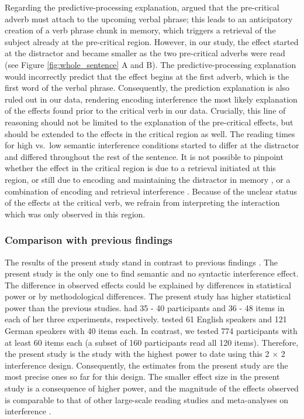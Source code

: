\documentclass[a4paper, man, floatsintext]{apa7}
\begin{document}
Regarding the predictive-processing explanation, \citet{mertzen} argued that the pre-critical adverb must attach to the upcoming verbal phrase; this leads to an anticipatory creation of a verb phrase chunk in memory, which triggers a retrieval of the subject already at the pre-critical region. However, in our study, the effect started at the distractor and became smaller as the two pre-critical adverbs were read (see Figure \ref{fig:whole_sentence} A and B). The predictive-processing explanation would incorrectly predict that the effect begins at the first adverb, which is the first word of the verbal phrase. Consequently, the prediction explanation is also ruled out in our data, rendering encoding interference the most likely explanation of the effects found prior to the critical verb in our data. Crucially, this line of reasoning should not be limited to the explanation of the pre-critical effects, but should be extended to the effects in the critical region as well. The reading times for high vs.\ low semantic interference conditions started to differ at the distractor and differed throughout the rest of the sentence. It is not possible to pinpoint whether the effect in the critical region is due to a retrieval initiated at this region, or still due to encoding and maintaining the distractor in memory \citep{ness2017}, or a combination of encoding and retrieval interference \parencite{Yadavetal2022}. Because of the unclear status of the effects at the critical verb, we refrain from interpreting the interaction which was only observed in this region.

\subsubsection{Comparison with previous findings}
The results of the present study stand in contrast to previous findings \citep{vandyke07, mertzen}. The present study is the only one to find semantic and no syntactic interference effect. The difference in observed effects could be explained by differences in statistical power or by methodological differences. The present study has higher statistical power than the previous studies. \citet{vandyke07} had 35 - 40 participants and 36 - 48 items in each of her three experiments, respectively. \textcite{mertzen} tested 61 English speakers and 121 German speakers with 40 items each. In contrast, we tested 774 participants with at least 60 items each (a subset of 160 participants read all 120 items). Therefore, the present study is the study with the highest power to date using this 2 $\times$ 2 interference design. Consequently, the estimates from the present study are the most precise ones so far for this design. The smaller effect size in the present study is a consequence of higher power, and the magnitude of the effects observed is comparable to that of other large-scale reading studies \citep{nicenboim} and meta-analyses on interference \citep{jaeger_etal_2017}.
\end{document}
